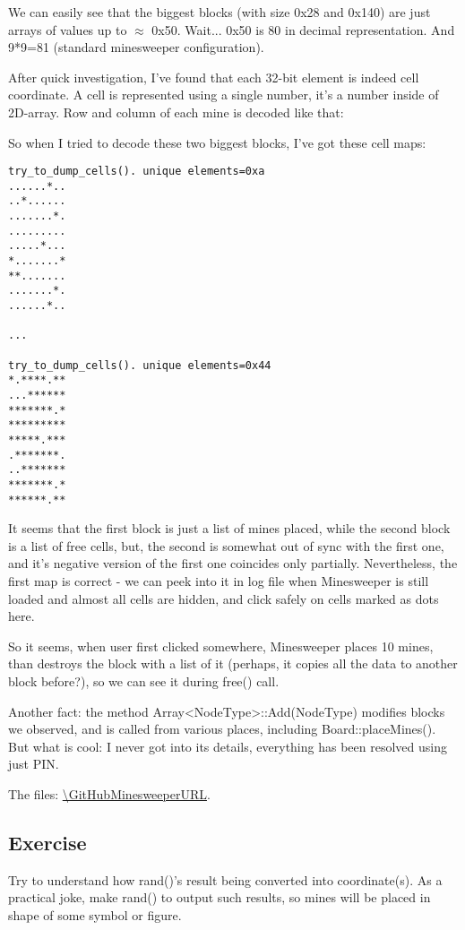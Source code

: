 We can easily see that the biggest blocks (with size 0x28 and 0x140) are just arrays of values up to $\approx$ 0x50.
Wait... 0x50 is 80 in decimal representation. And 9*9=81 (standard minesweeper configuration).

After quick investigation, I've found that each 32-bit element is indeed cell coordinate.
A cell is represented using a single number, it's a number inside of 2D-array.
Row and column of each mine is decoded like that: 

So when I tried to decode these two biggest blocks, I've got these cell maps:

\begin{lstlisting}
try_to_dump_cells(). unique elements=0xa
......*..
..*......
.......*.
.........
.....*...
*.......*
**.......
.......*.
......*..

...

try_to_dump_cells(). unique elements=0x44
*.****.**
...******
*******.*
*********
*****.***
.*******.
..*******
*******.*
******.**
\end{lstlisting}

It seems that the first block is just a list of mines placed, while the second block is a list of free cells, but, the second is somewhat out of sync with the first one,
and it's negative version of the first one coincides only partially.
Nevertheless, the first map is correct - we can peek into it in log file when Minesweeper is still loaded and almost all cells are hidden, and click safely on cells marked as dots here.

So it seems, when user first clicked somewhere, Minesweeper places 10 mines, than destroys the block with a list of it (perhaps, it copies all the data to another block before?),
so we can see it during free() call.

Another fact: the method Array<NodeType>::Add(NodeType) modifies blocks we observed, and is called from various places, including Board::placeMines().
But what is cool: I never got into its details, everything has been resolved using just PIN.

The files: \url{\GitHubMinesweeperURL}.

\subsection{Exercise}

Try to understand how rand()'s result being converted into coordinate(s).
As a practical joke, make rand() to output such results, so mines will be placed in shape of some symbol or figure.

